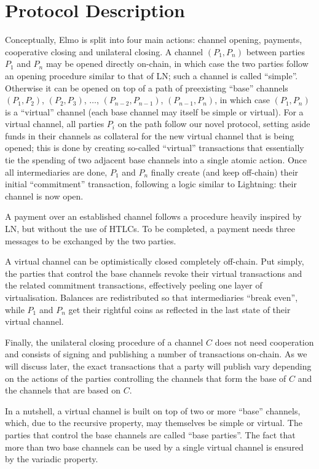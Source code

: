 \section{Protocol Description}
  Conceptually, Elmo is split into four main actions: channel opening,
  payments, cooperative closing and unilateral closing. A channel $(P_1, P_n)$
  between parties $P_1$ and $P_n$
  may be opened directly on-chain, in which case the two parties follow an
  opening procedure similar to that of LN; such a channel is called ``simple''.
  Otherwise it can be opened on top of a path
  of preexisting ``base'' channels $(P_1, P_2)$, $(P_2, P_3)$, $\dots$, $(P_{n-2},
  P_{n-1})$, $(P_{n-1}, P_{n})$, in which case $(P_1, P_n)$ is a ``virtual''
  channel (each base channel may itself be simple or virtual). For a virtual
  channel, all parties $P_i$ on the
  path follow our novel protocol, setting aside funds in their channels as
  collateral for the new virtual channel that is being opened; this is done
  by creating so-called ``virtual'' transactions that essentially tie the
  spending of two adjacent base channels into a single atomic action. Once all
  intermediaries are done, $P_1$ and $P_n$ finally create (and keep
  off-chain) their initial ``commitment'' transaction, following a logic similar
  to Lightning: their channel is now open.

  A payment over an established channel follows a procedure heavily inspired by
  LN, but without the use of HTLCs. To be completed, a payment needs three
  messages to be exchanged by the two parties.

  A virtual channel can be optimistically closed completely off-chain. Put
  simply, the parties that control the base channels revoke their virtual
  transactions and the related commitment transactions, effectively peeling one
  layer of virtualisation. Balances are redistributed so that intermediaries
  ``break even'', while $P_1$ and $P_n$ get their rightful coins as reflected in
  the last state of their virtual channel.

  Finally, the unilateral closing procedure of a channel $C$ does not need
  cooperation and consists of signing and publishing a number of transactions
  on-chain. As
  we will discuss later, the exact transactions that a party will publish vary
  depending on the actions of the parties controlling the channels that form the
  base of $C$ and the channels that are based on $C$.

  In a nutshell, a virtual channel is built on top of two or more ``base''
  channels, which, due to the recursive property, may themselves be simple or
  virtual. The parties that control the base channels are called ``base
  parties''. The fact that more than two base channels can be used by a single
  virtual channel is ensured by the variadic property.


